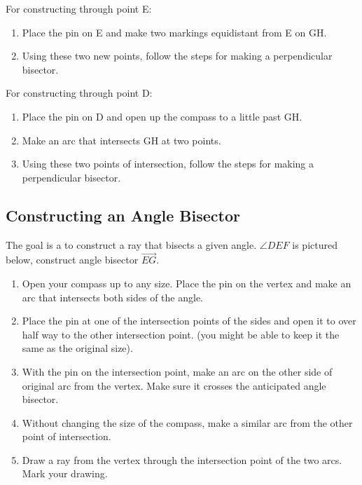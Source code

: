 \noindent For constructing through point \pnt E:
\begin{enumerate}
\item Place the pin on E and make two markings equidistant from \pnt E on \seg GH.
\item Using these two new points, follow the steps for making a perpendicular bisector.
\end{enumerate}
For constructing through point \pnt D:
\begin{enumerate}
\item Place the pin on \pnt D and open up the compass to a little past \seg GH.
\item Make an arc that intersects \seg GH at two points.
\item Using these two points of intersection, follow the steps for making a perpendicular bisector. 
\end{enumerate}

\vspace{0.75cm}

\begin{center}
\end{center}

\vspace{2cm}

\subsection{Constructing an Angle Bisector}
The goal is a to construct a ray that bisects a given angle. \q $\angle DEF$ is pictured below, construct angle bisector $\overrightarrow{EG}$.

\begin{enumerate}
\item Open your compass up to any size.  Place the pin on the vertex and make an arc that intersects both sides of the angle.
\item Place the pin at one of the intersection points of the sides and open it to over half way to the other intersection point. (you might be able to keep it the same as the original size).
\item With the pin on the intersection point, make an arc on the other side of original arc from the vertex.  Make sure it crosses the anticipated angle bisector.
\item Without changing the size of the compass, make a similar arc from the other point of intersection. 
\item Draw a ray from the vertex through the intersection point of the two arcs.  Mark your drawing.
\end{enumerate}

